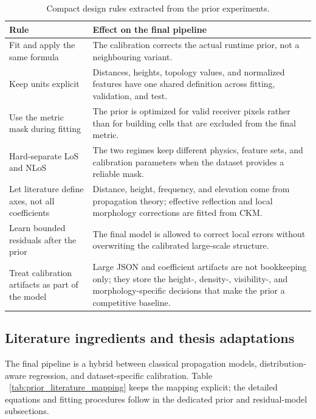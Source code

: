 \begin{table}[H]
\centering
\caption{Compact design rules extracted from the prior experiments.}
\label{tab:prior_design_rules}
\small
\begin{tabularx}{\textwidth}{>{\raggedright\arraybackslash}p{}
>{\raggedright\arraybackslash}X}
\toprule
Rule & Effect on the final pipeline \\
\midrule
Fit and apply the same formula &
The calibration corrects the actual runtime prior, not a neighbouring variant. \\
Keep units explicit &
Distances, heights, topology values, and normalized features have one shared
definition across fitting, validation, and test. \\
Use the metric mask during fitting &
The prior is optimized for valid receiver pixels rather than for building cells
that are excluded from the final metric. \\
Hard-separate LoS and NLoS &
The two regimes keep different physics, feature sets, and calibration
parameters when the dataset provides a reliable mask. \\
Let literature define axes, not all coefficients &
Distance, height, frequency, and elevation come from propagation theory;
effective reflection and local morphology corrections are fitted from CKM. \\
Learn bounded residuals after the prior &
The final model is allowed to correct local errors without overwriting the calibrated
large-scale structure. \\
Treat calibration artifacts as part of the model &
Large JSON and coefficient artifacts are not bookkeeping only; they store the
height-, density-, visibility-, and morphology-specific decisions that make the
prior a competitive baseline. \\
\bottomrule
\end{tabularx}
\end{table}

\subsection{Literature ingredients and thesis adaptations}

The final pipeline is a hybrid between classical propagation models,
distribution-aware regression, and dataset-specific calibration. Table
~\ref{tab:prior_literature_mapping} keeps the mapping explicit; the detailed
equations and fitting procedures follow in the dedicated prior and residual-model subsections.

